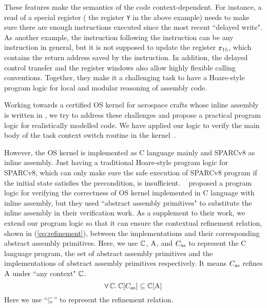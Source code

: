 These features make the semantics of the \sparc{} code
context-dependent. For instance, a read of a special register
(\eg{} the register {\tt Y} in the above example) needs to
make sure there are enough instructions executed since the
most recent ``delayed write". As another example,
the instruction following the \call{} instruction can be any
instruction in general, but it is not supposed to
update the register $\texttt{r}_{15}$, which contains the return
address saved by the \call{} instruction.
In addition,
the delayed control transfer
and the register windows also allow highly flexible calling
conventions. Together, they make it a challenging task
to have a Hoare-style program logic for local and modular
reasoning of \sparc{} assembly code.

Working towards a certified OS kernel for aerospace
crafts whose inline assembly is written in \sparc,
we try to address these challenges and propose a practical
program logic for realistically modelled \sparc{} code.
We have applied our logic to verify the main body of
the task context switch routine in the kernel~\cite{zha18aplas}.

However, the OS kernel is implemented as
C language mainly and SPARCv8 as inline assembly.
Just having a traditional Hoare-style
program logic for SPARCv8, which can only make sure
the safe execution of SPARCv8 program if the initial
state satisfies the precondition, is insufficient.
~\cite{Xu16cav} proposed a program logic for
verifying the correctness of OS kernel implemented in
C language with inline assembly,
but they used ``abstract assembly primitives" to
substitute the inline assembly in their verification work.
As a supplement to their work, we extend our
program logic so that it can ensure the
contextual refinement relation,
shown in (\ref{eq:refinement}),
between the implementations and
their corresponding abstract assembly primitives.
Here, we use $\mathbb{C}$, $\text{A}$,
and $C_{\text{as}}$ to represent the C language program,
the set of abstract assembly
primitives and the implementations of
abstract assembly primitives respectively.
It means $C_{\text{as}}$ refines $\text{A}$ under
``any context" $\mathbb{C}$.
\begin{equation}
    \forall \, \mathbb{C}. \,
    \mathbb{C}[C_{\text{as}}] \subseteq \mathbb{C}[\text{A}]
    \label{eq:refinement}
\end{equation}
%
Here we use ``$\subseteq$'' to represent the refinement
relation.
%

